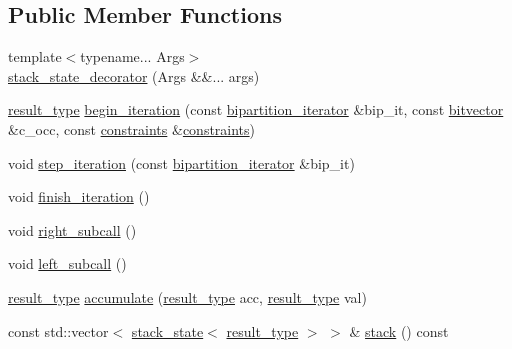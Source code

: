 \subsection*{Public Member Functions}
\begin{DoxyCompactItemize}
\item 
{\footnotesize template$<$typename... Args$>$ }\\\hyperlink{classterraces_1_1debug_1_1variants_1_1stack__state__decorator_a1f72f35c4ec868bb5bba02806c7ddbb3}{stack\+\_\+state\+\_\+decorator} (Args \&\&... args)
\item 
\hyperlink{classterraces_1_1debug_1_1variants_1_1stack__state__decorator_a01062643b31a3124c3e77d409f112785}{result\+\_\+type} \hyperlink{classterraces_1_1debug_1_1variants_1_1stack__state__decorator_ac650dee955aa719620f14c93ed67820d}{begin\+\_\+iteration} (const \hyperlink{classterraces_1_1bipartition__iterator}{bipartition\+\_\+iterator} \&bip\+\_\+it, const \hyperlink{namespaceterraces_a1b526fb554dff829f7ad51eb21d5ed06}{bitvector} \&c\+\_\+occ, const \hyperlink{namespaceterraces_a6f603ffd30ed4d902fce6424492e0581}{constraints} \&\hyperlink{namespaceterraces_a6f603ffd30ed4d902fce6424492e0581}{constraints})
\item 
void \hyperlink{classterraces_1_1debug_1_1variants_1_1stack__state__decorator_a1f93e11840c3fed2902f925a2fb10f5f}{step\+\_\+iteration} (const \hyperlink{classterraces_1_1bipartition__iterator}{bipartition\+\_\+iterator} \&bip\+\_\+it)
\item 
void \hyperlink{classterraces_1_1debug_1_1variants_1_1stack__state__decorator_ac09a4841c6a5b236ae9bd3ec8bf39b77}{finish\+\_\+iteration} ()
\item 
void \hyperlink{classterraces_1_1debug_1_1variants_1_1stack__state__decorator_a6d1de019820009248a9362a3407c7b94}{right\+\_\+subcall} ()
\item 
void \hyperlink{classterraces_1_1debug_1_1variants_1_1stack__state__decorator_a2dcd5551b46929e3a4a1ddcca619f6e4}{left\+\_\+subcall} ()
\item 
\hyperlink{classterraces_1_1debug_1_1variants_1_1stack__state__decorator_a01062643b31a3124c3e77d409f112785}{result\+\_\+type} \hyperlink{classterraces_1_1debug_1_1variants_1_1stack__state__decorator_a3ab51f3a9522d1ba4b068d00f5d74e0a}{accumulate} (\hyperlink{classterraces_1_1debug_1_1variants_1_1stack__state__decorator_a01062643b31a3124c3e77d409f112785}{result\+\_\+type} acc, \hyperlink{classterraces_1_1debug_1_1variants_1_1stack__state__decorator_a01062643b31a3124c3e77d409f112785}{result\+\_\+type} val)
\item 
const std\+::vector$<$ \hyperlink{structterraces_1_1debug_1_1variants_1_1stack__state}{stack\+\_\+state}$<$ \hyperlink{classterraces_1_1debug_1_1variants_1_1stack__state__decorator_a01062643b31a3124c3e77d409f112785}{result\+\_\+type} $>$ $>$ \& \hyperlink{classterraces_1_1debug_1_1variants_1_1stack__state__decorator_a371be3718c4eb307a46f313db17cfd18}{stack} () const
\end{DoxyCompactItemize}


